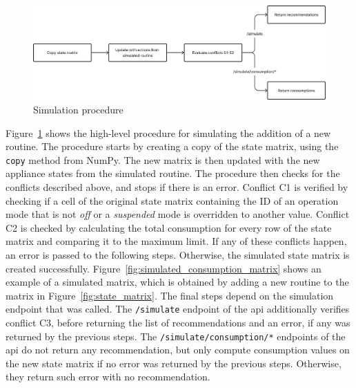 \begin{figure}
    \centering
    \includegraphics[width=\textwidth]{images/simulation_procedure.png}
    \caption{Simulation procedure}
    \label{fig:simulation_procedure}
\end{figure}

Figure~\ref{fig:simulation_procedure} shows the high-level procedure for simulating the addition of a new routine. The procedure starts by creating a copy of the state matrix, using the \texttt{copy} method from NumPy. The new matrix is then updated with the new appliance states from the simulated routine. The procedure then checks for the conflicts described above, and stops if there is an error. Conflict C1 is verified by checking if a cell of the original state matrix containing the ID of an operation mode that is not \textit{off} or a \textit{suspended} mode is overridden to another value. Conflict C2 is checked by calculating the total consumption for every row of the state matrix and comparing it to the maximum limit. If any of these conflicts happen, an error is passed to the following steps. Otherwise, the simulated state matrix is created successfully. Figure~\ref{fig:simulated_consumption_matrix} shows an example of a simulated matrix, which is obtained by adding a new routine to the matrix in Figure~\ref{fig:state_matrix}. The final steps depend on the simulation endpoint that was called. The \texttt{/simulate} endpoint of the \acrshort{api} additionally verifies conflict C3, before returning the list of recommendations and an error, if any was returned by the previous steps. The \texttt{/simulate/consumption/*} endpoints of the \acrshort{api} do not return any recommendation, but only compute consumption values on the new state matrix if no error was returned by the previous steps. Otherwise, they return such error with no recommendation. 

